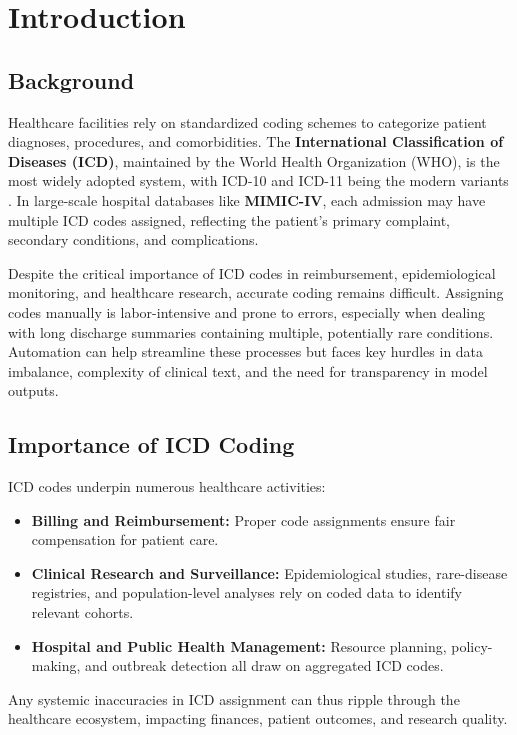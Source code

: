 \chapter{Introduction}
\label{chap:introduction}

\section{Background}
Healthcare facilities rely on standardized coding schemes to categorize patient diagnoses, procedures, and comorbidities. The \textbf{International Classification of Diseases (ICD)}, maintained by the World Health Organization (WHO), is the most widely adopted system, with ICD-10 and ICD-11 being the modern variants \cite{who2019icd11}. In large-scale hospital databases like \textbf{MIMIC-IV}, each admission may have multiple ICD codes assigned, reflecting the patient’s primary complaint, secondary conditions, and complications.

Despite the critical importance of ICD codes in reimbursement, epidemiological monitoring, and healthcare research, accurate coding remains difficult. Assigning codes manually is labor-intensive and prone to errors, especially when dealing with long discharge summaries containing multiple, potentially rare conditions. Automation can help streamline these processes but faces key hurdles in data imbalance, complexity of clinical text, and the need for transparency in model outputs.

\section{Importance of ICD Coding}
ICD codes underpin numerous healthcare activities:
\begin{itemize}
    \item \textbf{Billing and Reimbursement:} Proper code assignments ensure fair compensation for patient care.
    \item \textbf{Clinical Research and Surveillance:} Epidemiological studies, rare-disease registries, and population-level analyses rely on coded data to identify relevant cohorts.
    \item \textbf{Hospital and Public Health Management:} Resource planning, policy-making, and outbreak detection all draw on aggregated ICD codes.
\end{itemize}
Any systemic inaccuracies in ICD assignment can thus ripple through the healthcare ecosystem, impacting finances, patient outcomes, and research quality.

